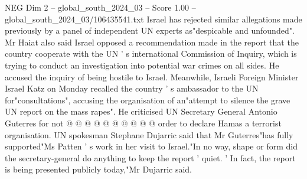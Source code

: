 \begin{textsample}{NEG Dim 2 – global\_south\_2024\_03 – Score 1.00 – global\_south\_2024\_03/106435541.txt}
Israel has rejected similar allegations made previously by a panel of independent UN experts as"despicable and unfounded".
Mr Haiat also said Israel opposed a recommendation made in the report that the country cooperate with the UN ' s international Commission of Inquiry, which is trying to conduct an investigation into potential war crimes on all sides.
He accused the inquiry of being hostile to Israel.
Meanwhile, Israeli Foreign Minister Israel Katz on Monday recalled the country ' s ambassador to the UN for"consultations", accusing the organisation of an"attempt to silence the grave UN report on the mass rapes".
He criticised UN Secretary General Antonio Guterres for not @ @ @ @ @ @ @ @ @ @ order to declare Hamas a terrorist organisation.
UN spokesman Stephane Dujarric said that Mr Guterres"has fully supported"Ms Patten ' s work in her visit to Israel."In no way, shape or form did the secretary-general do anything to keep the report ' quiet. ' In fact, the report is being presented publicly today,"Mr Dujarric said.

\end{textsample}
